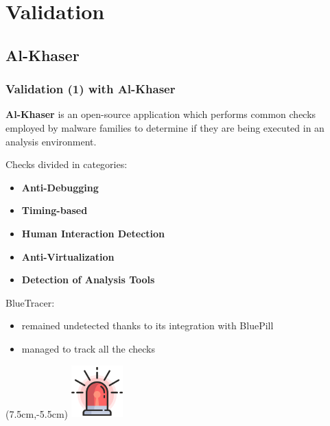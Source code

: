 \documentclass[compress]{beamer}
\begin{document}
\section{Validation}

\subsection{Al-Khaser}
\begin{frame}
    \frametitle{Validation (1) with Al-Khaser}
    \begin{beamerboxesrounded}[shadow=true]{}
	\textbf{Al-Khaser} is an open-source application which performs common checks employed by malware families to determine if they are being
executed in an analysis environment.
\end{beamerboxesrounded}
\medskip
Checks divided in categories:
\begin{itemize}
\item \textbf{Anti-Debugging}
\item \textbf{Timing-based}
\item \textbf{Human Interaction Detection}
\item \textbf{Anti-Virtualization}
\item \textbf{Detection of Analysis Tools}
\end{itemize}
\medskip
\begin{beamerboxesrounded}[shadow=true]{}
BlueTracer: 
\begin{itemize}
\item remained undetected thanks to its integration with BluePill
\item managed to track all the checks
\end{itemize}
\end{beamerboxesrounded}

    \begin{textblock*}{3cm}(7.5cm,-5.5cm)
   \includegraphics[width=2cm]{image/lights.png}%
	\end{textblock*}

\end{frame}
\end{document}
